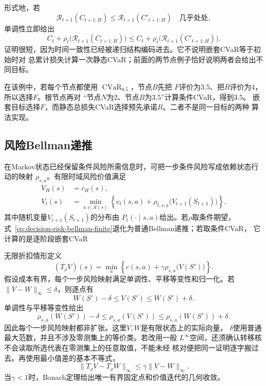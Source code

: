 形式地，若
\[
  \mathcal{R}_{t+1}(C_{t+1:H})
  \leq
  \mathcal{R}_{t+1}(C'_{t+1:H})
  \quad\text{几乎处处},
\]
单调性立即给出
\[
  C_t+
  \rho_t\bigl(\mathcal{R}_{t+1}(C_{t+1:H})\bigr)
  \leq
  C_t+
  \rho_t\bigl(\mathcal{R}_{t+1}(C'_{t+1:H})\bigr).
\]
证明很短，因为时间一致性已经被递归结构编码进去。它不说明嵌套CVaR等于初始时对
总累计损失计算一次静态CVaR；前面的两节点例子恰好说明两者会给出不同目标。

在该例中，若每个节点都使用
\(\operatorname{CVaR}_{0.5}\)，节点\(B\)先把
\(F\)评价为\(3.5\)、把\(R\)评价为\(4\)，所以选择\(F\)。根节点再对
“节点\(N\)为\(2\)、节点\(B\)为\(3.5\)”计算条件CVaR，得到\(3.5\)。
嵌套目标选择\(F\)，而静态总损失CVaR选择预先承诺\(R\)。二者不是同一目标的两种
算法实现。

\subsection{风险Bellman递推}
在Markov状态已经保留条件风险所需信息时，可把一步条件风险写成依赖状态行动的映射
\(\rho_{s,a}\)。有限时域风险价值满足
\begin{align}
  V_H(s)
  &=
  c_H(s),\\
  V_t(s)
  &=
  \min_{a\in\mathcal{A}(s)}
  \left\{
    c_t(s,a)+
    \rho_{t,s,a}\bigl(V_{t+1}(S_{t+1})\bigr)
  \right\}.
  \label{eq:decision-risk-bellman-finite}
\end{align}
其中随机变量\(V_{t+1}(S_{t+1})\)的分布由
\(P_t(\cdot\mid s,a)\)给出。若\(\rho\)取条件期望，
式~\eqref{eq:decision-risk-bellman-finite}退化为普通Bellman递推；若取条件CVaR，
它计算的是逐阶段嵌套CVaR

无限折扣情形定义
\begin{equation}
  (T_\rho V)(s)
  =
  \min_a
  \left\{
    c(s,a)+
    \gamma
    \rho_{s,a}\bigl(V(S')\bigr)
  \right\}.
  \label{eq:decision-risk-bellman-operator}
\end{equation}
假设成本有界，每个一步风险映射满足单调性、平移等变性和归一化。若
\(\lVert V-W\rVert_\infty\leq\delta\)，则逐点有
\[
  W(S')-\delta
  \leq
  V(S')
  \leq
  W(S')+\delta.
\]
单调性与平移等变性给出
\[
  \rho_{s,a}(W(S'))-\delta
  \leq
  \rho_{s,a}(V(S'))
  \leq
  \rho_{s,a}(W(S'))+\delta.
\]
因此每个一步风险映射都非扩张。这里\(V,W\)是有限状态上的实际向量，
\(\delta\)使用普通最大范数，并且不涉及零测集上的等价类。若改用一般
\(L^\infty\)空间，还须确认转移核不会读取所选代表在零测集上的任意取值，不能未经
核对便把同一证明逐字搬过去。再使用最小值差的基本不等式，
\begin{equation}
  \lVert T_\rho V-T_\rho W\rVert_\infty
  \leq
  \gamma\lVert V-W\rVert_\infty.
  \label{eq:decision-risk-bellman-contraction}
\end{equation}
当\(\gamma<1\)时，Banach定理给出唯一有界固定点和价值迭代的几何收敛。


